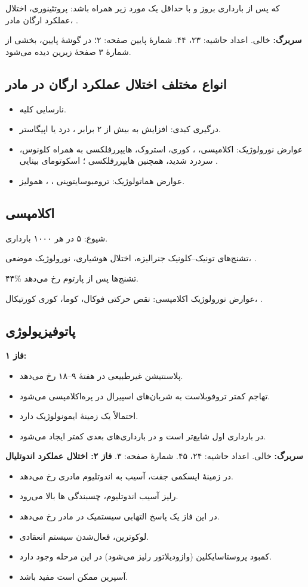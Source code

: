 \documentclass[12pt,a4paper]{article}
\begin{document}
 که پس از  بارداری بروز و با حداقل یک مورد زیر همراه باشد: پروتئینوری، اختلال عملکرد ارگان مادر، .

\textbf{سربرگ:}  خالی. اعداد حاشیه: ۲۳، ۴۴. شمارهٔ پایین صفحه: ۲؛ در گوشهٔ پایین، بخشی از شمارهٔ ۳ صفحهٔ زیرین دیده می‌شود.
\subsection*{انواع مختلف اختلال عملکرد ارگان در مادر}
\begin{itemize}
\item نارسایی کلیه.
\item درگیری کبدی: افزایش  به بیش از ۲ برابر ، \HTNm{\pm} درد  یا اپیگاستر.
\item عوارض نورولوژیک: اکلامپسی، ، کوری، استروک، هایپررفلکسی به همراه کلونوس، سردرد شدید، همچنین هایپررفلکسی ؛ اسکوتومای بینایی .
\item عوارض هماتولوژیک: ترومبوسایتوپنی ، ، همولیز.
\end{itemize}
\subsection*{اکلامپسی}
شیوع: ۵ در هر ۱۰۰۰ بارداری.

تشنج‌های تونیک--کلونیک جنرالیزه، اختلال هوشیاری، نورولوژیک موضعی، .

۴۴\% تشنج‌ها پس از پارتوم رخ می‌دهد.

عوارض نورولوژیک اکلامپسی: نقص حرکتی فوکال، کوما، کوری کورتیکال، .
\subsection*{پاتوفیزیولوژی}
\textbf{فاز ۱: }
\begin{itemize}
\item پلاسنتیشن غیرطبیعی در هفتهٔ ۹--۱۸ رخ می‌دهد.
\item تهاجم کمتر تروفوبلاست به شریان‌های اسپیرال در پره‌اکلامپسی می‌شود.
\item احتمالاً یک زمینهٔ ایمونولوژیک دارد.
\item در بارداری اول شایع‌تر است و در بارداری‌های بعدی کمتر ایجاد می‌شود.
\end{itemize}

\textbf{سربرگ:}  خالی. اعداد حاشیه: ۲۴، ۴۵. شمارهٔ صفحه: ۳.
\textbf{فاز ۲: اختلال عملکرد اندوتلیال}
\begin{itemize}
\item در زمینهٔ ایسکمی جفت، آسیب به اندوتلیوم مادری رخ می‌دهد.
\item رلیز آسیب اندوتلیوم، چسبندگی ها بالا می‌رود.
\item در این فاز یک پاسخ التهابی سیستمیک  در مادر رخ می‌دهد.
\item لوکوترین، فعال‌شدن سیستم انعقادی.
\item کمبود پروستاسایکلین (وازودیلاتور رلیز می‌شود) در این مرحله وجود دارد.
\item آسپرین ممکن است مفید باشد.
\end{itemize}
\end{document}
